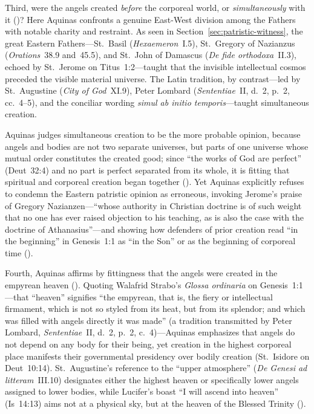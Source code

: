 Third, were the angels created \emph{before} the corporeal world, or \emph{simultaneously} with it ()? Here Aquinas confronts a genuine East-West division among the Fathers with notable charity and restraint. As seen in Section~\ref{sec:patristic-witness}, the great Eastern Fathers---St.~Basil (\emph{Hexaemeron}~I.5), St.~Gregory of Nazianzus (\emph{Orations}~38.9 and~45.5), and St.~John of Damascus (\emph{De fide orthodoxa}~II.3), echoed by St.~Jerome on Titus~1:2---taught that the invisible intellectual cosmos preceded the visible material universe. The Latin tradition, by contrast---led by St.~Augustine (\emph{City of God}~XI.9), Peter Lombard (\emph{Sententiae}~II, d.~2, p.~2, cc.~4--5), and the conciliar wording \emph{simul ab initio temporis}---taught simultaneous creation.

Aquinas judges simultaneous creation to be the more probable opinion, because angels and bodies are not two separate universes, but parts of one universe whose mutual order constitutes the created good; since ``the works of God are perfect'' (Deut~32:4) and no part is perfect separated from its whole, it is fitting that spiritual and corporeal creation began together (). Yet Aquinas explicitly refuses to condemn the Eastern patristic opinion as erroneous, invoking Jerome's praise of Gregory Nazianzen---``whose authority in Christian doctrine is of such weight that no one has ever raised objection to his teaching, as is also the case with the doctrine of Athanasius''---and showing how defenders of prior creation read ``in the beginning'' in Genesis~1:1 as ``in the Son'' or as the beginning of corporeal time ().

Fourth, Aquinas affirms by fittingness that the angels were created in the empyrean heaven (). Quoting Walafrid Strabo's \emph{Glossa ordinaria} on Genesis~1:1---that ``heaven'' signifies ``the empyrean, that is, the fiery or intellectual firmament, which is not so styled from its heat, but from its splendor; and which was filled with angels directly it was made'' (a tradition transmitted by Peter Lombard, \emph{Sententiae}~II, d.~2, p.~2, c.~4)---Aquinas emphasizes that angels do not depend on any body for their being, yet creation in the highest corporeal place manifests their governmental presidency over bodily creation (St.~Isidore on Deut~10:14). St.~Augustine's reference to the ``upper atmosphere'' (\emph{De Genesi ad litteram}~III.10) designates either the highest heaven or specifically lower angels assigned to lower bodies, while Lucifer's boast ``I will ascend into heaven'' (Is~14:13) aims not at a physical sky, but at the heaven of the Blessed Trinity ().


